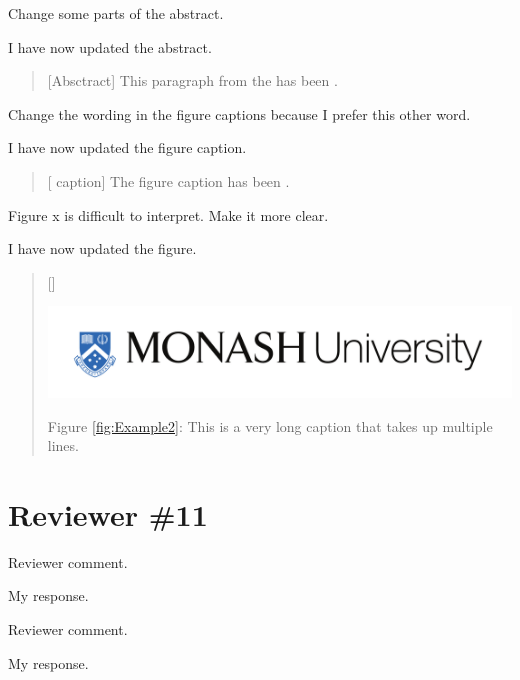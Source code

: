 \documentclass{AuthorResponse}
\begin{document}
\RC Change some parts of the abstract.

I have now updated the abstract.

\begin{quote}[Absctract]
	This paragraph from the   has been  .
\end{quote}


\RC Change the wording in the figure captions because I prefer this other word.

I have now updated the figure caption.

\begin{quote}[ caption]
	The figure caption has been  .
\end{quote}


\RC Figure x is difficult to interpret. Make it more clear.

I have now updated the figure.

\begin{quote}[]
	\centerline{\includegraphics[width=0.5\columnwidth,keepaspectratio]{Figures/monash-logo.pdf}}
	Figure \ref{fig:Example2}: This is a very long caption that takes up multiple lines.
\end{quote}


\section{Reviewer \#11}
\RC Reviewer comment.

My response.


\RC Reviewer comment.

My response.


\end{document}
